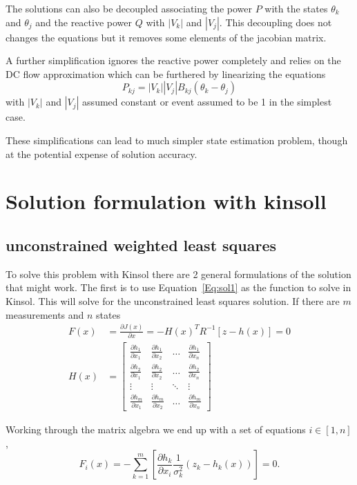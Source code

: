 \documentclass[11pt]{article} %
\newcommand{\pdiff}[2]{\frac{\partial #1}{\partial #2}}
\begin{document}
The solutions can also be decoupled associating the power $P$ with the states $\theta_k$ and $\theta_j$ and the reactive power $Q$ with $|V_k|$ and $|V_j|$.  This decoupling does not changes the equations but it removes some elements of the jacobian matrix.

A further simplification ignores the reactive power completely and relies on the DC flow approximation which can be furthered by linearizing the equations
\begin{equation}
P_{kj}=|V_k||V_j| B_{kj}(\theta_k-\theta_j)
\end{equation}
with $|V_k|$ and $|V_j|$ assumed constant or event assumed to be 1 in the simplest case.

These simplifications can lead to much simpler state estimation problem, though at the potential expense of solution accuracy.

\section{Solution formulation with kinsoll}
\subsection{unconstrained weighted least squares}

To solve this problem with Kinsol there are 2 general formulations of the solution that might work.  The first is to use Equation~\ref{Eq:sol1} as the function to solve in Kinsol.  This will solve for the unconstrained least squares solution.  If there are $m$ measurements and $n$ states
\begin{equation}
\begin{aligned}
F(x)&=\frac{\partial J(x)}{\partial x} = -H(x)^T R^{-1} \left[z-h(x)\right] = 0\\
H(x) &= \left[
\begin{matrix}
\pdiff{h_1}{x_1} & \pdiff{h_1}{x_2} & \hdots & \pdiff{h_1}{x_n} \\
\pdiff{h_2}{x_1} & \pdiff{h_2}{x_2} & \hdots & \pdiff{h_2}{x_n} \\
\vdots & \vdots & \ddots & \vdots \\
\pdiff{h_m}{x_1} & \pdiff{h_m}{x_2} & \hdots & \pdiff{h_m}{x_n}
\end{matrix}
\right]
\end{aligned}
\end{equation}
 
Working through the matrix algebra we end up with a set of equations $i \in [1,n]$,
\begin{equation}
F_i(x)=-\sum_{k=1}^m\left[\pdiff{h_k}{x_i}\frac{1}{\sigma_k^2}(z_k-h_k(x))\right]=0.
\end{equation}
\end{document}
